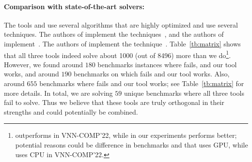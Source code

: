 \paragraph{Comparison with state-of-the-art solvers: }
The tools \alphabeta{} and \ovaltool{} use several algorithms that are highly optimized and use several techniques. 
The authors of \alphabeta{} implement the techniques~\cite{zhang2018efficient,wang2021beta,xu2020fast,zhang2022branch,tjeng2017evaluating}, 
and the authors of \ovaltool{} implement~\cite{bunel2018unified,bunel2020branch,bunel2020lagrangian,de2021scaling,de2021scaling,de2021scaling2,de2021improved}.
The authors of \marabou{} implement the technique~\cite{katz2019marabou}. 
Table~\ref{tb:matrix} shows that all three tools indeed solve about 1000 (out of 8496) more than 
we do\footnote{\alphabeta{} outperforms \marabou{} in VNN-COMP'22, while in our experiments \marabou{} performs better; potential reasons could be difference in benchmarks and that \alphabeta{} uses \textsc{GPU}, while \marabou{} uses \textsc{CPU} in VNN-COMP'22.}. 
However, we found around $180$ benchmarks instances where \alphabeta{} fails, and our tool works, 
and around $190$ benchmarks on which \ovaltool{} fails and our tool works. 
Also, around $655$ benchmarks where \marabou{} fails and our tool works; see Table~\ref{tb:matrix} for more details. 
In total, we are solving $59$ unique benchmarks where all three tools fail to solve. 
Thus we believe that these tools are truly orthogonal in their strengths and could potentially be combined. 




